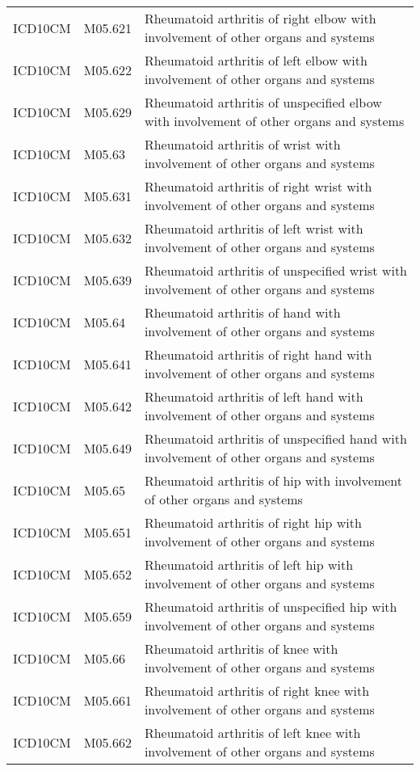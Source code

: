 \begin{longtable}{p{}p{}p{}}
  ICD10CM & M05.621 & Rheumatoid arthritis of right elbow with involvement of other organs and systems \\ 
  ICD10CM & M05.622 & Rheumatoid arthritis of left elbow with involvement of other organs and systems \\ 
  ICD10CM & M05.629 & Rheumatoid arthritis of unspecified elbow with involvement of other organs and systems \\ 
  ICD10CM & M05.63 & Rheumatoid arthritis of wrist with involvement of other organs and systems \\ 
  ICD10CM & M05.631 & Rheumatoid arthritis of right wrist with involvement of other organs and systems \\ 
  ICD10CM & M05.632 & Rheumatoid arthritis of left wrist with involvement of other organs and systems \\ 
  ICD10CM & M05.639 & Rheumatoid arthritis of unspecified wrist with involvement of other organs and systems \\ 
  ICD10CM & M05.64 & Rheumatoid arthritis of hand with involvement of other organs and systems \\ 
  ICD10CM & M05.641 & Rheumatoid arthritis of right hand with involvement of other organs and systems \\ 
  ICD10CM & M05.642 & Rheumatoid arthritis of left hand with involvement of other organs and systems \\ 
  ICD10CM & M05.649 & Rheumatoid arthritis of unspecified hand with involvement of other organs and systems \\ 
  ICD10CM & M05.65 & Rheumatoid arthritis of hip with involvement of other organs and systems \\ 
  ICD10CM & M05.651 & Rheumatoid arthritis of right hip with involvement of other organs and systems \\ 
  ICD10CM & M05.652 & Rheumatoid arthritis of left hip with involvement of other organs and systems \\ 
  ICD10CM & M05.659 & Rheumatoid arthritis of unspecified hip with involvement of other organs and systems \\ 
  ICD10CM & M05.66 & Rheumatoid arthritis of knee with involvement of other organs and systems \\ 
  ICD10CM & M05.661 & Rheumatoid arthritis of right knee with involvement of other organs and systems \\ 
  ICD10CM & M05.662 & Rheumatoid arthritis of left knee with involvement of other organs and systems \\ 

\end{longtable}
